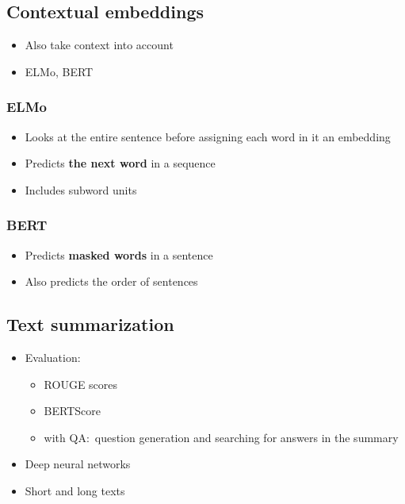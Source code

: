 \documentclass{article}
\begin{document}
    \subsection{Contextual embeddings}
    \begin{itemize}
        \item Also take context into account 
        \item ELMo, BERT
    \end{itemize}

        \subsubsection{ELMo}
        \begin{itemize}
            \item Looks at the entire sentence before assigning each word in it an embedding
            \item Predicts \textbf{the next word} in a sequence
            \item Includes subword units
        \end{itemize}

        \subsubsection{BERT}
        \begin{itemize}
            \item Predicts \textbf{masked words} in a sentence
            \item Also predicts the order of sentences
        \end{itemize}

    \subsection{Text summarization}
    \begin{itemize}
        \item Evaluation:
        \begin{itemize}
            \item ROUGE scores
            \item BERTScore
            \item with QA:\ question generation and searching for answers in the summary
        \end{itemize}
        \item Deep neural networks
        \item Short and long texts
    \end{itemize}
\end{document}

